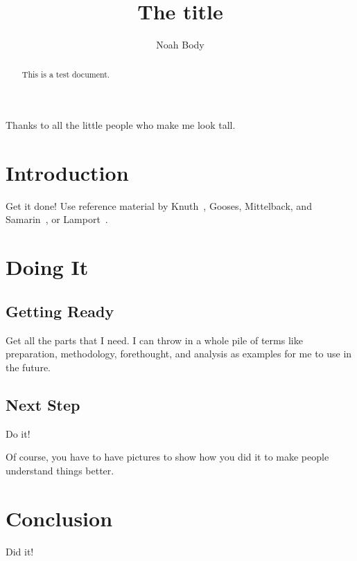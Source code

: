 \documentclass[12pt]{dalcsthesis}
\begin{document}
\phd %
\title{The title}
\author{Noah Body}




\nolistoftables
\nolistoffigures

\frontmatter

\begin{abstract}
This is a test document.
\end{abstract}

\begin{acknowledgements}
Thanks to all the little people who make me look tall.
\end{acknowledgements}

\mainmatter

\chapter{Introduction}

Get it done!  Use reference material by Knuth~\cite{the-tex-book},
Gooses, Mittelback, and Samarin~\cite{latex-companion}, or
Lamport~\cite{latex-by-lamport}.


\chapter{Doing It}

\section{Getting Ready}

Get all the parts that I need.  I can throw in a whole pile of terms like
preparation,
methodology,
forethought,
and
analysis
as examples for me to use in the future.

\section{Next Step}

Do it!

Of course, you have to have pictures to show how you did it to make people
understand things better.

\chapter{Conclusion}

Did it!



\end{document}
